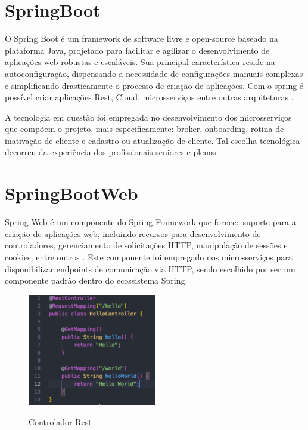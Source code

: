 \section{SpringBoot}
O Spring Boot é um framework de software livre e open-source baseado na plataforma Java, projetado para facilitar e agilizar o desenvolvimento de aplicações web robustas e escaláveis. Sua principal característica reside na autoconfiguração, dispensando a necessidade de configurações manuais complexas e simplificando drasticamente o processo de criação de aplicações. Com o spring é possível criar aplicações Rest, Cloud, microsserviços entre outras arquiteturas \cite{spring:explicacao}.

A tecnologia em questão foi empregada no desenvolvimento dos microsserviços que compõem o projeto, mais especificamente: broker, onboarding, rotina de inativação de cliente e cadastro ou atualização de cliente. Tal escolha tecnológica decorreu da experiência dos profissionais seniores e plenos.

\section{SpringBootWeb}

Spring Web é um componente do Spring Framework que fornece suporte para a criação de aplicações web, incluindo recursos para desenvolvimento de controladores, gerenciamento de solicitações HTTP, manipulação de sessões e cookies, entre outros \cite{spring:web:explicacao}. Este componente foi empregado nos microsserviços para disponibilizar endpoints de comunicação via HTTP, sendo escolhido por ser um componente padrão dentro do ecossistema Spring.
\begin{figure}[h!]
    \centering
    \caption{Controlador Rest}
    \includegraphics[width=0.5\textwidth]{arquivos/imagens/spring-web.png}
    \label{controlador rest}
\end{figure}

